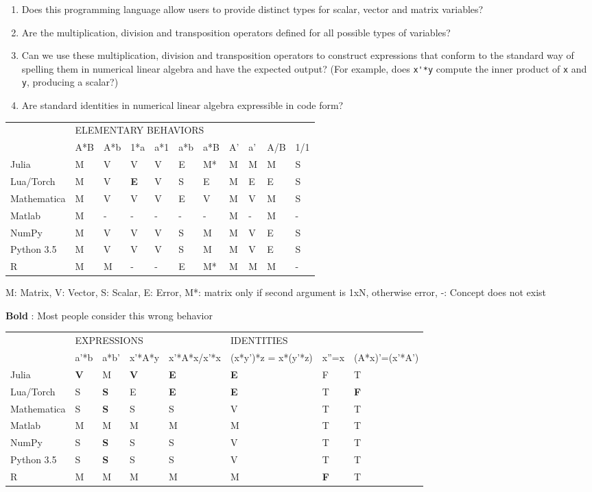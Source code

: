 \begin{enumerate}

\item
Does this programming language allow users to provide distinct types for
scalar, vector and matrix variables?

\item
Are the multiplication, division and transposition operators defined for all
possible types of variables?

\item
Can we use these multiplication, division and transposition operators to
construct expressions that conform to the standard way of spelling them in
numerical linear algebra and have the expected output? (For example, does
\verb`x'*y` compute the inner product of \verb`x` and \verb`y`, producing a
scalar?)

\item
Are standard identities in numerical linear algebra expressible in code form?

\end{enumerate}

\begin{tabular}{|l|l|l|l|l|l|l|l|l|l|l|}
\cline{2-11}
\multicolumn{1}{l|}{} & \multicolumn{10}{l|}{ELEMENTARY BEHAVIORS}\tabularnewline
\cline{2-11}
\multicolumn{1}{l|}{} & A{*}B & A{*}b & 1{*}a & a{*}1 & a{*}b & a{*}B & A' & a' & A/B & 1/1\tabularnewline
\midrule
Julia & M & V & V & V & E & M{*} & M & M & M & S\tabularnewline
\midrule
Lua/Torch & M & V & \textbf{E} & V & S & E & M & E & E & S\tabularnewline
\midrule
Mathematica & M & V & V & V & E & V & M & V & M & S\tabularnewline
\midrule
Matlab & M & - & - & - & - & - & M & - & M & -\tabularnewline
\midrule
NumPy & M & V & V & V & S & M & M & V & E & S\tabularnewline
\midrule
Python 3.5 & M & V & V & V & S & M & M & V & E & S\tabularnewline
\midrule
R & M & M & - & - & E & M{*} & M & M & M & -\tabularnewline
\midrule
\end{tabular}

M: Matrix, V: Vector, S: Scalar, E: Error, M{*}: matrix only if second
argument is 1xN, otherwise error, -: Concept does not exist

\textbf{Bold} : Most people consider this wrong behavior

\begin{tabular}{|l|l|l|l|l|l|l|l|}
\cline{2-8}
\multicolumn{1}{l|}{} & \multicolumn{4}{l|}{EXPRESSIONS} & \multicolumn{3}{l|}{IDENTITIES}\tabularnewline
\cline{2-8}
\multicolumn{1}{l|}{} & a'{*}b & a{*}b' & x'{*}A{*}y & x'{*}A{*}x/x'{*}x & (x{*}y'){*}z = x{*}(y'{*}z) & x''=x & (A{*}x)'=(x'{*}A')\tabularnewline
\midrule
Julia & \textbf{V} & M & \textbf{V} & \textbf{E} & \textbf{E} & F & T\tabularnewline
\midrule
Lua/Torch & S & \textbf{S} & E & \textbf{E} & \textbf{E} & T & \textbf{F}\tabularnewline
\midrule
Mathematica & S & \textbf{S} & S & S & V & T & T\tabularnewline
\midrule
Matlab & M & M & M & M & M & T & T\tabularnewline
\midrule
NumPy & S & \textbf{S} & S & S & V & T & T\tabularnewline
\midrule
Python 3.5 & S & \textbf{S} & S & S & V & T & T\tabularnewline
\midrule
R & M & M & M & M & M & \textbf{F} & T\tabularnewline
\midrule
\end{tabular}

